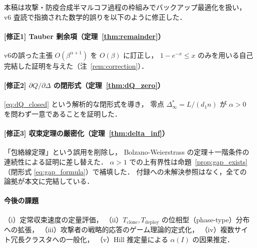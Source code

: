 \documentclass[12pt,a4paper]{article}
\theoremstyle{plain}
\theoremstyle{definition}
\theoremstyle{remark}
\newcommand{\alphI}{\alpha(I)}
\newcommand{\Dinf}{\Delta^{*}_{\infty}}
\begin{document}
本稿は攻撃・防疫合成半マルコフ過程の枠組みでバックアップ最適化を扱い，
v6 査読で指摘された数学的誤りを以下のように修正した．

\paragraph{[修正1] Tauber 剰余項（定理~\ref{thm:remainder}）}
v6の誤った主張 $O(\beta^{\alpha+1})$ を $O(\beta)$ に訂正し，
$1-e^{-x}\le x$ のみを用いる自己完結した証明を与えた（注~\ref{rem:correction}）．

\paragraph{[修正2] $\partial Q/\partial\Delta$ の閉形式（定理~\ref{thm:dQ_zero}）}
\eqref{eq:dQ_closed} という解析的な閉形式を導き，
零点 $\Dinf=L/(d_1n)$ が $\alpha>0$ を問わず一意であることを証明した．

\paragraph{[修正3] 収束定理の厳密化（定理~\ref{thm:delta_inf}）}
「包絡線定理」という誤用を削除し，
Bolzano-Weierstrass の定理＋一階条件の連続性による証明に差し替えた．
$\alpha>1$ での上有界性は命題~\ref{prop:gap_exists}（閉形式 \eqref{eq:gap_formula}）で補填した．
付録への未解決参照はなく，全ての論拠が本文に完結している．

\paragraph{今後の課題}
（i）定常収束速度の定量評価，
（ii）$T_{\mathrm{clone}},T_{\mathrm{deploy}}$ の位相型（phase-type）分布への拡張，
（iii）攻撃者の戦略的応答のゲーム理論的定式化，
（iv）複数サイト冗長クラスタへの一般化，
（v）Hill 推定量による $\alphI$ の因果推定．
\end{document}
